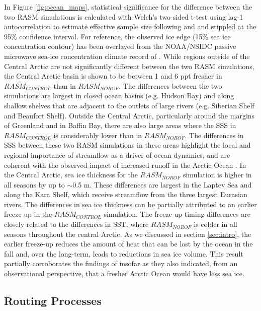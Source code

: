 \documentclass[jgrga, draft]{agutex}
\begin{document}
\begin{article}
In Figure \ref{fig:ocean_maps}, statistical significance for the difference between the two RASM simulations is calculated with Welch's two-sided t-test using lag-1 autocorrelation to estimate effective sample size following \citet{VonStorch1999} and \citet{Wilks2006} and stippled at the 95\% confidence interval.
For reference, the observed ice edge (15\% sea ice concentration contour) has been overlayed from the NOAA/NSIDC passive microwave sea-ice concentration climate record of \citep{Meier2013}.
While regions outside of the Central Arctic are not significantly different between the two RASM simulations, the Central Arctic basin is shown to be between 1 and 6 ppt fresher in $RASM_{CONTROL}$ than in $RASM_{NOROF}$.
The differences between the two simulations are largest in closed ocean basins (e.g. Hudson Bay) and along shallow shelves that are adjacent to the outlets of large rivers (e.g. Siberian Shelf and Beaufort Shelf).
Outside the Central Arctic, particularly around the margins of Greenland and in Baffin Bay, there are also large areas where the SSS in $RASM_{CONTROL}$ is considerably lower than in $RASM_{NOROF}$.
The differences in SSS between these two RASM simulations in these areas highlight the local and regional importance of streamflow as a driver of ocean dynamics, and are coherent with the observed impact of increased runoff in the Arctic Ocean \citep [e.g.][]{Morison_2012}.
In the Central Arctic, sea ice thickness for the $RASM_{NOROF}$ simulation is higher in all seasons by up to $\sim$0.5 m.
These differences are largest in the Laptev Sea and along the Kara Shelf, which receive streamflow from the three largest Eurasian rivers.
The differences in sea ice thickness can be partially attributed to an earlier freeze-up in the $RASM_{CONTROL}$ simulation.
The freeze-up timing differences are closely related to the differences in SST, where $RASM_{NOROF}$ is colder in all seasons throughout the central Arctic.
As we discussed in section \ref{sec:intro}, the earlier freeze-up reduces the amount of heat that can be lost by the ocean in the fall and, over the long-term, leads to reductions in sea ice volume.
This result partially corroborates the findings of \citep{Morison_2012} insofar as they also indicated, from an observational perspective, that a fresher Arctic Ocean would have less sea ice.

\subsection{Routing Processes}
\label{sec:rout_procs}


\end{article}
\end{document}
